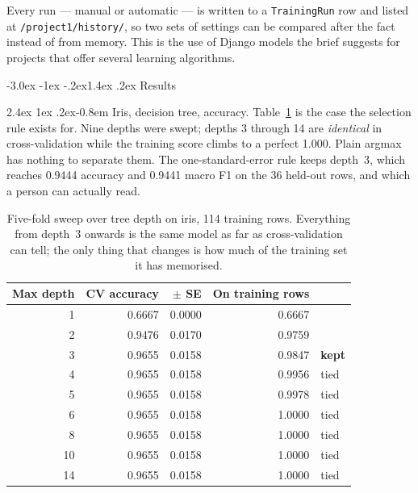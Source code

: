 \documentclass[11pt,a4paper]{article}
\makeatletter
\renewcommand\subsection{\@startsection{subsection}{2}{\z@}%
  {-3.0ex \@plus -1ex \@minus -.2ex}{1.4ex \@plus .2ex}%
  {\normalfont\large\sffamily\bfseries\color{accent}}}
\renewcommand\paragraph{\@startsection{paragraph}{4}{\z@}%
  {2.4ex \@plus1ex \@minus.2ex}{-0.8em}%
  {\normalfont\normalsize\sffamily\bfseries\color{code}}}
\newcommand{\file}[1]{\texttt{\small #1}}
\makeatother
\begin{document}
Every run --- manual or automatic --- is written to a \texttt{TrainingRun} row and
listed at \file{/project1/history/}, so two sets of settings can be compared after
the fact instead of from memory. This is the use of Django models the brief
suggests for projects that offer several learning algorithms.

\subsection{Results}

\paragraph{Iris, decision tree, accuracy.} Table~\ref{tab:iris} is the case the
selection rule exists for. Nine depths were swept; depths 3 through 14 are
\emph{identical} in cross-validation while the training score climbs to a perfect
1.000. Plain argmax has nothing to separate them. The one-standard-error rule
keeps depth~3, which reaches 0.9444 accuracy and 0.9441 macro F1 on the 36
held-out rows, and which a person can actually read.

\begin{table}[H]
\centering
\small
\begin{tabular}{@{}rrrrl@{}}
\toprule
\textbf{Max depth} & \textbf{CV accuracy} & \textbf{$\pm$ SE} & \textbf{On training rows} & \\
\midrule
1  & 0.6667 & 0.0000 & 0.6667 & \\
2  & 0.9476 & 0.0170 & 0.9759 & \\
3  & 0.9655 & 0.0158 & 0.9847 & \textbf{kept} \\
4  & 0.9655 & 0.0158 & 0.9956 & tied \\
5  & 0.9655 & 0.0158 & 0.9978 & tied \\
6  & 0.9655 & 0.0158 & 1.0000 & tied \\
8  & 0.9655 & 0.0158 & 1.0000 & tied \\
10 & 0.9655 & 0.0158 & 1.0000 & tied \\
14 & 0.9655 & 0.0158 & 1.0000 & tied \\
\bottomrule
\end{tabular}
\caption{Five-fold sweep over tree depth on iris, 114 training rows. Everything
from depth~3 onwards is the same model as far as cross-validation can tell; the
only thing that changes is how much of the training set it has memorised.}
\label{tab:iris}
\end{table}
\end{document}
